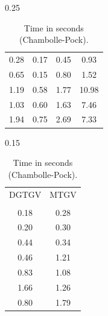 \documentclass[twocolumn,envcountsame]{svjour3}
\begin{document}
\begin{table}[htb]
\begin{subtable}[t]{0.25\linewidth}
\begin{tabular}{cccc}
0.28 & 0.17 & 0.45 & 0.93 \\                                                      
0.65 & 0.15 & 0.80 & 1.52 \\                                                       
\midrule
1.19 & 0.58 & 1.77 & 10.98 \\                                                         
1.03 & 0.60 & 1.63 & 7.46 \\                                                         
1.94 & 0.75 & 2.69 & 7.33 \\     
\bottomrule                                                                               
\end{tabular}                                                                             
\caption{Time in seconds (Chambolle-Pock).}
\label{table:MTGVvsDGTGVdefault_time}                                                      
\end{subtable}%
\hspace*{1em}
\begin{subtable}[t]{0.15\linewidth}
\centering
\setlength\tabcolsep{1.5pt}
\begin{tabular}{cc}                                                                                       
\toprule                                                                                                     
DGTGV & MTGV \\
\multicolumn{2}{c}{ }\\
\midrule
0.18 & 0.28 \\                                                                                           
0.20 & 0.30 \\                                                                                           
0.44 & 0.34 \\                                                                                           
\midrule
0.46 & 1.21 \\                                                                                            
0.83 & 1.08 \\                                                                                              
1.66 & 1.26 \\                                                                                              
\midrule
0.80 & 1.79 \\                                                                                            

\end{tabular}
\end{subtable}
\end{table}
\end{document}
